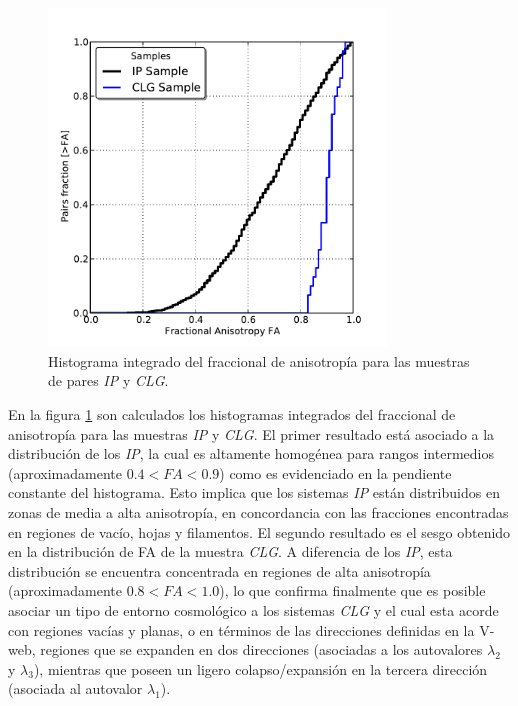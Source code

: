 \begin{figure}[htbp]
	\centering
	\includegraphics[trim = 0mm 0mm 0mm 10mm, clip, width=0.8\textwidth]
	{./figures/4_results/CLG_FA_Hist.pdf}
	
	\caption{\small{Histograma integrado del fraccional de anisotropía para
	las muestras de pares \textit{IP} y \textit{CLG}.}}
	\label{fig:FA_samples}
\end{figure}


En la figura \ref{fig:FA_samples} son calculados los histogramas integrados
del fraccional de anisotropía para las muestras \textit{IP} y \textit{CLG}.
El primer resultado está asociado a la distribución de los \textit{IP}, 
la cual es altamente homogénea para rangos intermedios (aproximadamente 
$0.4 < FA < 0.9$) como es evidenciado en la pendiente constante del 
histograma. Esto implica que los sistemas \textit{IP} están distribuidos
en zonas de media a alta anisotropía, en concordancia con las fracciones 
encontradas en regiones de vacío, hojas y filamentos. El segundo resultado
es el sesgo obtenido en la distribución de FA de la muestra \textit{CLG}.
A diferencia de los \textit{IP}, esta distribución se encuentra concentrada 
en regiones de alta anisotropía (aproximadamente $0.8 < FA < 1.0$), lo que
confirma finalmente que es posible asociar un tipo de entorno cosmológico a 
los sistemas \textit{CLG} y el cual esta acorde con regiones vacías y 
planas, o en términos de las direcciones definidas en la V-web, regiones 
que se expanden en dos direcciones (asociadas a los autovalores 
$\lambda_2$ y $\lambda_3$), mientras que poseen un ligero colapso/expansión 
en la tercera dirección (asociada al autovalor $\lambda_1$). 


